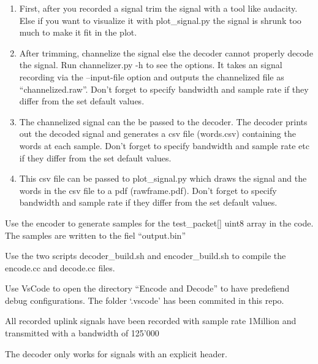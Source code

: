 \begin{enumerate}
\def\labelenumi{\arabic{enumi}.}
\item
  First, after you recorded a signal trim the signal with a tool like
  audacity. Else if you want to visualize it with plot\_signal.py the
  signal is shrunk too much to make it fit in the plot.
\item
  After trimming, channelize the signal else the decoder cannot properly
  decode the signal. Run channelizer.py -h to see the options. It takes
  an signal recording via the --input-file option and outputs the
  channelized file as ``channelized.raw''. Don't forget to specify
  bandwidth and sample rate if they differ from the set default values.
\item
  The channelized signal can the be passed to the decoder. The decoder
  prints out the decoded signal and generates a csv file (words.csv)
  containing the words at each sample. Don't forget to specify bandwidth
  and sample rate etc if they differ from the set default values.
\item
  This csv file can be passed to plot\_signal.py which draws the signal
  and the words in the csv file to a pdf (rawframe.pdf). Don't forget to
  specify bandwidth and sample rate if they differ from the set default
  values.
\end{enumerate}

Use the encoder to generate samples for the test\_packet{[}{]} uint8
array in the code. The samples are written to the fiel ``output.bin''

Use the two scripts decoder\_build.sh and encoder\_build.sh to compile
the encode.cc and decode.cc files.

Use VsCode to open the directory ``Encode and Decode'' to have
predefiend debug configurations. The folder `.vscode' has been commited
in this repo.

All recorded uplink signals have been recorded with sample rate 1Million
and transmitted with a bandwidth of 125'000

The decoder only works for signals with an explicit header.
